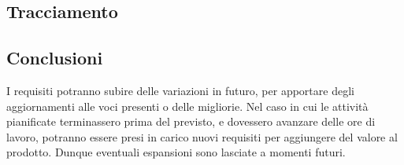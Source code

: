 \subsection{Tracciamento}



\subsection{Conclusioni}
I requisiti potranno subire delle variazioni in futuro, per apportare degli aggiornamenti alle
voci presenti o delle migliorie. Nel caso in cui le attività pianificate terminassero prima del
previsto, e dovessero avanzare delle ore di lavoro, potranno essere presi in carico nuovi requisiti
per aggiungere del valore al prodotto. Dunque eventuali espansioni sono lasciate a momenti
futuri.